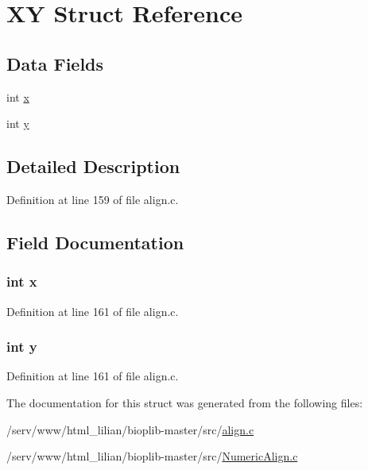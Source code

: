 \hypertarget{struct_x_y}{\section{X\-Y Struct Reference}
\label{struct_x_y}
}
\subsection*{Data Fields}
\begin{DoxyCompactItemize}
\item 
int \hyperlink{struct_x_y_a6150e0515f7202e2fb518f7206ed97dc}{x}
\item 
int \hyperlink{struct_x_y_a0a2f84ed7838f07779ae24c5a9086d33}{y}
\end{DoxyCompactItemize}


\subsection{Detailed Description}


Definition at line 159 of file align.\-c.



\subsection{Field Documentation}
\hypertarget{struct_x_y_a6150e0515f7202e2fb518f7206ed97dc}{
\subsubsection[{x}]{\setlength{\rightskip}{0pt plus 5cm}int x}}\label{struct_x_y_a6150e0515f7202e2fb518f7206ed97dc}


Definition at line 161 of file align.\-c.

\hypertarget{struct_x_y_a0a2f84ed7838f07779ae24c5a9086d33}{
\subsubsection[{y}]{\setlength{\rightskip}{0pt plus 5cm}int y}}\label{struct_x_y_a0a2f84ed7838f07779ae24c5a9086d33}


Definition at line 161 of file align.\-c.



The documentation for this struct was generated from the following files\-:\begin{DoxyCompactItemize}
\item 
/serv/www/html\-\_\-lilian/bioplib-\/master/src/\hyperlink{align_8c}{align.\-c}\item 
/serv/www/html\-\_\-lilian/bioplib-\/master/src/\hyperlink{_numeric_align_8c}{Numeric\-Align.\-c}\end{DoxyCompactItemize}
